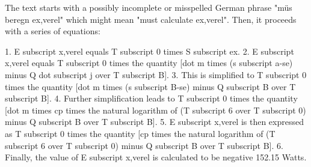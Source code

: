 The text starts with a possibly incomplete or misspelled German phrase "müs beregn ex,verel" which might mean "must calculate ex,verel". Then, it proceeds with a series of equations:

1. E subscript x,verel equals T subscript 0 times S subscript ex.
2. E subscript x,verel equals T subscript 0 times the quantity [dot m times (s subscript a-se) minus Q dot subscript j over T subscript B].
3. This is simplified to T subscript 0 times the quantity [dot m times (s subscript B-se) minus Q subscript B over T subscript B].
4. Further simplification leads to T subscript 0 times the quantity [dot m times cp times the natural logarithm of (T subscript 6 over T subscript 0) minus Q subscript B over T subscript B].
5. E subscript x,verel is then expressed as T subscript 0 times the quantity [cp times the natural logarithm of (T subscript 6 over T subscript 0) minus Q subscript B over T subscript B].
6. Finally, the value of E subscript x,verel is calculated to be negative 152.15 Watts.